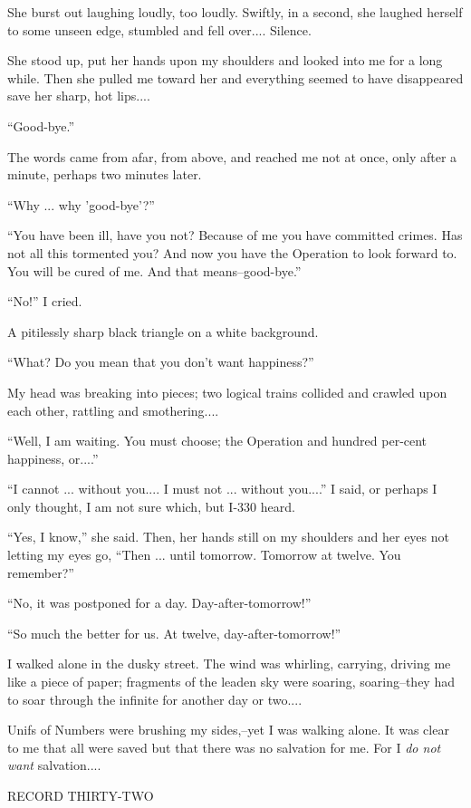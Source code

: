 \documentclass[11pt,openany]{book}
\begin{document}
She burst out laughing loudly, too loudly. Swiftly, in a second, she laughed herself to some unseen edge, stumbled and fell over.... Silence.

She stood up, put her hands upon my shoulders and looked into me for a long while. Then she pulled me toward her and everything seemed to have disappeared save her sharp, hot lips....

``Good-bye.''

The words came from afar, from above, and reached me not at once, only after a minute, perhaps two minutes later.

``Why ... why 'good-bye'?''

``You have been ill, have you not? Because of me you have committed crimes. Has not all this tormented you? And now you have the Operation to look forward to. You will be cured of me. And that means--good-bye.''

``No!'' I cried.

A pitilessly sharp black triangle on a white background.

``What? Do you mean that you don't want happiness?''

My head was breaking into pieces; two logical trains collided and crawled upon each other, rattling and smothering....

``Well, I am waiting. You must choose; the Operation and hundred per-cent happiness, or....''

``I cannot ... without you.... I must not ... without you....'' I said, or perhaps I only thought, I am not sure which, but I-330 heard.

``Yes, I know,'' she said. Then, her hands still on my shoulders and her eyes not letting my eyes go, ``Then ... until tomorrow. Tomorrow at twelve. You remember?''

``No, it was postponed for a day. Day-after-tomorrow!''

``So much the better for us. At twelve, day-after-tomorrow!''

I walked alone in the dusky street. The wind was whirling, carrying, driving me like a piece of paper; fragments of the leaden sky were soaring, soaring--they had to soar through the infinite for another day or two....

Unifs of Numbers were brushing my sides,--yet I was walking alone. It was clear to me that all were saved but that there was no salvation for me. For I \emph{do not want} salvation....

\begin{center}\textsc{RECORD THIRTY-TWO}\end{center}
\end{document}
